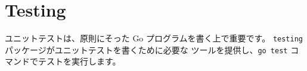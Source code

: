 \section{Testing}

ユニットテストは、原則にそった Go プログラムを書く上で重要です。 \texttt{testing} パッケージがユニットテストを書くために必要な ツールを提供し、\texttt{go test} コマンドでテストを実行します。





